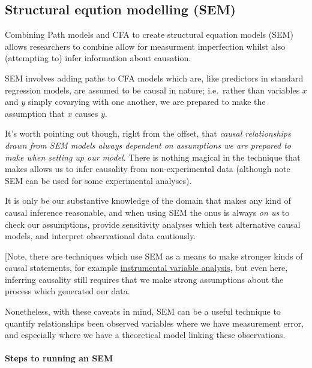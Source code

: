 \documentclass[]{article}
\let\oldparagraph\paragraph
\renewcommand{\paragraph}[1]{\oldparagraph{#1}\mbox{}}
\theoremstyle{definition}
\theoremstyle{definition}
\theoremstyle{definition}
\theoremstyle{remark}
\begin{document}
\hypertarget{sem}{\subsection*{Structural eqution modelling
(SEM)}\label{sem}}

Combining Path models and CFA to create structural equation models (SEM)
allows researchers to combine allow for measurment imperfection whilst
also (attempting to) infer information about causation.

SEM involves adding paths to CFA models which are, like predictors in
standard regression models, are assumed to be causal in nature;
i.e.~rather than variables \(x\) and \(y\) simply covarying with one
another, we are prepared to make the assumption that \(x\) causes \(y\).

It's worth pointing out though, right from the offset, that \emph{causal
relationships drawn from SEM models always dependent on assumptions we
are prepared to make when setting up our model}. There is nothing
magical in the technique that makes allows us to infer causality from
non-experimental data (although note SEM can be used for some
experimental analyses).

It is only be our substantive knowledge of the domain that makes any
kind of causal inference reasonable, and when using SEM the onus is
always \emph{on us} to check our assumptions, provide sensitivity
analyses which test alternative causal models, and interpret
observational data cautiously.

{[}Note, there are techniques which use SEM as a means to make stronger
kinds of causal statements, for example
\href{https://en.wikipedia.org/wiki/Instrumental_variable}{instrumental
variable analysis}, but even here, inferring causality still requires
that we make strong assumptions about the process which generated our
data.

Nonetheless, with these caveats in mind, SEM can be a useful technique
to quantify relationships been observed variables where we have
measurement error, and especially where we have a theoretical model
linking these observations.

\paragraph{Steps to running an SEM}\label{steps-to-running-an-sem}
\end{document}
